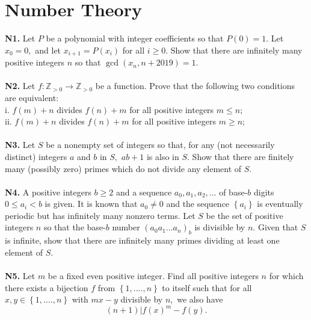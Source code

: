 \documentclass[12pt,a4paper]{article}
\begin{document}
\section*{Number Theory}
\textbf{N1.} Let \(P\) be a polynomial with integer coefficients so that \(P \left( 0 \right) = 1.\) Let \({x_0} = 0,\) and let \({x_{i + 1}} = P \left( x_i \right)\) for all \(i \ge 0.\) Show that there are infinitely many positive integers \(n\) so that \(\gcd \left( {{x_n},n + 2019} \right) = 1.\)\\
\\
\textbf{N2.} Let \(f: {\mathbb{Z}_{>0}} \to {\mathbb{Z}_{>0}}\) be a function. Prove that the following two conditions are equivalent:\\
i. \(f \left( m \right) + n\) divides  \(f \left( n \right) + m\) for all positive integers \(m \le n;\)\\
ii.  \(f \left( m \right) + n\) divides  \(f \left( n \right) + m\) for all positive integers \(m \ge n;\)\\
\\
\textbf{N3.} Let \(S\) be a nonempty set of integers so that, for any (not necessarily distinct) integers \(a\) and \(b\) in \(S,\) \(ab + 1\) is also in \(S.\) Show that there are finitely many (possibly zero) primes which do not divide any element of \(S.\)\\
\\
\textbf{N4.} A positive integers \(b \ge 2\) and a sequence \({a_0}, {a_1}, {a_2},...\) of base-\(b\) digits \(0 \le {a_i} < b\) is given. It is known that \({a_0} \ne 0\) and the sequence \(\left\{ {{a_i}} \right\}\) is eventually periodic but has infinitely many nonzero terms. Let \(S\) be the set of positive integers \(n\) so that the base-\(b\) number \({\left( {{a_0}{a_1}...{a_n}} \right)_b}\) is divisible by \(n.\) Given that \(S\) is infinite, show that there are infinitely many primes dividing at least one element of \(S.\)\\
\\
\textbf{N5.} Let \(m\) be a fixed even positive integer. Find all positive integers \(n\) for which there exists a bijection \(f\) from \(\left\{ {1,....,n} \right\}\) to itself such that for all \(x,y \in \left\{ {1,....,n} \right\}\) with \(mx - y\) divisible by \(n,\) we also have \[\left( {n + 1} \right)|f{\left( x \right)^m} - f\left( y \right).\]
\\
\end{document}
